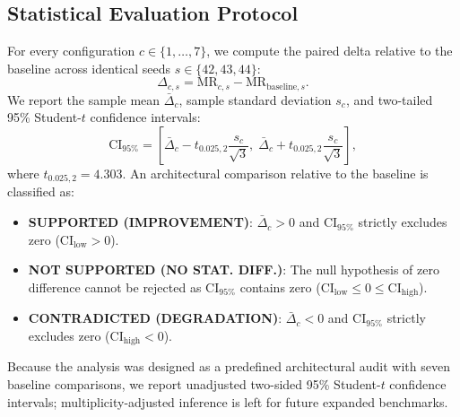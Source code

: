\documentclass[conference]{IEEEtran}
\begin{document}
\subsection{Statistical Evaluation Protocol}
For every configuration $c \in \{1, \dots, 7\}$, we compute the paired delta relative to the baseline across identical seeds $s \in \{42, 43, 44\}$:
\begin{equation}
\label{eq:paired_delta}
\Delta_{c, s} = \mathrm{MR}_{c, s} - \mathrm{MR}_{\mathrm{baseline}, s}.
\end{equation}
We report the sample mean $\bar{\Delta}_c$, sample standard deviation $s_c$, and two-tailed 95\% Student-$t$ confidence intervals:
\begin{equation}
\label{eq:confidence_interval}
\mathrm{CI}_{95\%} = \left[ \bar{\Delta}_c - t_{0.025, 2} \frac{s_c}{\sqrt{3}}, \; \bar{\Delta}_c + t_{0.025, 2} \frac{s_c}{\sqrt{3}} \right],
\end{equation}
where $t_{0.025, 2} = 4.303$. An architectural comparison relative to the baseline is classified as:
\begin{itemize}
    \item \textbf{SUPPORTED (IMPROVEMENT)}: $\bar{\Delta}_c > 0$ and $\mathrm{CI}_{95\%}$ strictly excludes zero ($\mathrm{CI}_{\mathrm{low}} > 0$).
    \item \textbf{NOT SUPPORTED (NO STAT. DIFF.)}: The null hypothesis of zero difference cannot be rejected as $\mathrm{CI}_{95\%}$ contains zero ($\mathrm{CI}_{\mathrm{low}} \le 0 \le \mathrm{CI}_{\mathrm{high}}$).
    \item \textbf{CONTRADICTED (DEGRADATION)}: $\bar{\Delta}_c < 0$ and $\mathrm{CI}_{95\%}$ strictly excludes zero ($\mathrm{CI}_{\mathrm{high}} < 0$).
\end{itemize}
Because the analysis was designed as a predefined architectural audit with seven baseline comparisons, we report unadjusted two-sided 95\% Student-$t$ confidence intervals; multiplicity-adjusted inference is left for future expanded benchmarks.
\end{document}
